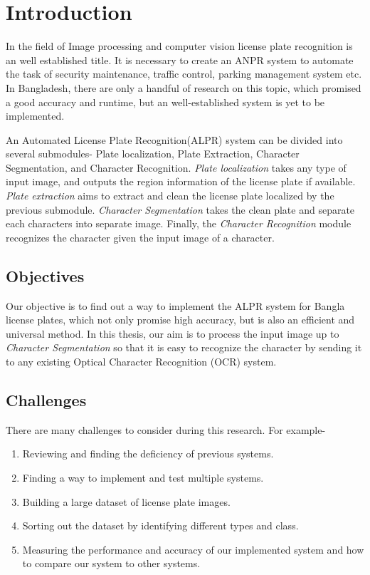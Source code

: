 \documentclass{standalone}
\begin{document}
\chapter{Introduction}
In the field of Image processing and computer vision license plate recognition is an well established title. It is necessary to create an ANPR system to automate the task of security maintenance, traffic control, parking management system etc. In Bangladesh, there are only a handful of research on this topic, which promised a good accuracy and runtime, but an well-established system is yet to be implemented.

An Automated License Plate Recognition(ALPR) system can be divided into several submodules- Plate localization, Plate Extraction, Character Segmentation, and Character Recognition. {\it Plate localization} takes any type of input image, and outputs the region information of the license plate if available. {\it Plate extraction} aims to extract and clean the license plate localized by the previous submodule. {\it Character Segmentation} takes the clean plate and separate each characters into separate image. Finally, the {\it Character Recognition} module recognizes the character given the input image of a character. 



\section{Objectives}
Our objective is to find out a way to implement the ALPR system for Bangla license plates, which not only promise high accuracy, but is also an efficient and universal method. In this thesis, our aim is to process the input image up to {\it Character Segmentation} so that it is easy to recognize the character by sending it to any existing Optical Character Recognition (OCR) system.



\section{Challenges}
There are many challenges to consider during this research. For example-

\begin{enumerate}
	\item Reviewing and finding the deficiency of previous systems.
	\item Finding a way to implement and test multiple systems.
    \item Building a large dataset of license plate images.
    \item Sorting out the dataset by identifying different types and class.
    \item Measuring the performance and accuracy of our implemented system and how to compare our system to other systems.
\end{enumerate}
    
\end{document}
